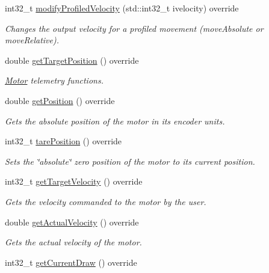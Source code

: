 \begin{DoxyCompactItemize}
int32\+\_\+t \mbox{\hyperlink{classokapi_1_1ThreadedMockMotor_a84e066f57201b2d2c8e54d5782d79b68}{modify\+Profiled\+Velocity}} (std\+::int32\+\_\+t ivelocity) override
\begin{DoxyCompactList}\small\item\em Changes the output velocity for a profiled movement (move\+Absolute or move\+Relative). \end{DoxyCompactList}\item 
double \mbox{\hyperlink{classokapi_1_1ThreadedMockMotor_a6672ed05fca974c48f34bd279d6ab57b}{get\+Target\+Position}} () override
\begin{DoxyCompactList}\small\item\em \mbox{\hyperlink{classokapi_1_1Motor}{Motor}} telemetry functions. \end{DoxyCompactList}\item 
double \mbox{\hyperlink{classokapi_1_1ThreadedMockMotor_aa728374b77bd0a29af4b8715d782b241}{get\+Position}} () override
\begin{DoxyCompactList}\small\item\em Gets the absolute position of the motor in its encoder units. \end{DoxyCompactList}\item 
int32\+\_\+t \mbox{\hyperlink{classokapi_1_1ThreadedMockMotor_aa7ccc33d3100bf1d58c3d3cb40cad6de}{tare\+Position}} () override
\begin{DoxyCompactList}\small\item\em Sets the \char`\"{}absolute\char`\"{} zero position of the motor to its current position. \end{DoxyCompactList}\item 
int32\+\_\+t \mbox{\hyperlink{classokapi_1_1ThreadedMockMotor_a7be292b3f0626710a23048f268b79786}{get\+Target\+Velocity}} () override
\begin{DoxyCompactList}\small\item\em Gets the velocity commanded to the motor by the user. \end{DoxyCompactList}\item 
double \mbox{\hyperlink{classokapi_1_1ThreadedMockMotor_a40697e4c42239f7c6c411663a030ee71}{get\+Actual\+Velocity}} () override
\begin{DoxyCompactList}\small\item\em Gets the actual velocity of the motor. \end{DoxyCompactList}\item 
int32\+\_\+t \mbox{\hyperlink{classokapi_1_1ThreadedMockMotor_ad4fd90f6ac8f5ae9c0adcaab7d6043e5}{get\+Current\+Draw}} () override

\end{DoxyCompactItemize}
